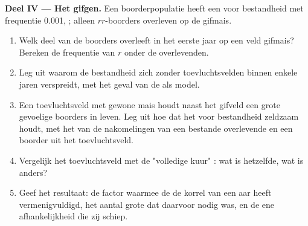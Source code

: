 \begin{problem}
\medskip
\noindent\textbf{Deel IV --- Het gifgen.}
Een boorderpopulatie heeft een  voor bestandheid met frequentie
0.001, ; alleen $rr$-boorders overleven op de gifmais.
\begin{enumerate}[resume]
  \item Welk deel van de boorders overleeft in het eerste jaar op een
        veld gifmais? Bereken de frequentie van $r$ onder de
        overlevenden.
  \item Leg uit waarom de bestandheid zich zonder toevluchtsvelden binnen
        enkele jaren verspreidt, met het geval van de  als
        model.
  \item Een toevluchtsveld met gewone mais houdt naast het gifveld een
        grote  gevoelige boorders in leven. Leg uit hoe dat het
         voor bestandheid zeldzaam houdt, met het  van de
        nakomelingen van een bestande overlevende en een boorder uit het
        toevluchtsveld.
  \item Vergelijk het toevluchtsveld met de "volledige kuur" :
        wat is hetzelfde, wat is anders?
  \item Geef het resultaat: de factor waarmee de  de korrel
        van een aar heeft vermenigvuldigd, het aantal grote  dat
        daarvoor nodig was, en de ene afhankelijkheid die zij schiep.
\end{enumerate}
\end{problem}
